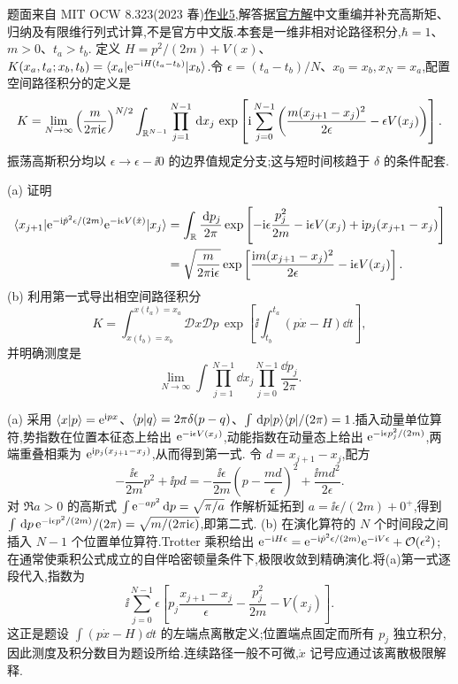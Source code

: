 题面来自 MIT OCW 8.323(2023 春)\href{https://ocw.mit.edu/courses/8-323-relativistic-quantum-field-theory-i-spring-2023/mit8_323_s23_pset05.pdf}{作业5},解答据\href{https://ocw.mit.edu/courses/8-323-relativistic-quantum-field-theory-i-spring-2023/mit8_323_s23_pset_05sol.pdf}{官方解}中文重编并补充高斯矩、归纳及有限维行列式计算,不是官方中文版.本套是一维非相对论路径积分,$\hbar=1$、$m>0$、$t_a>t_b$.
定义 $H=p^2/(2m)+V(x)$、$K(x_a,t_a;x_b,t_b)=\langle x_a\rvert\mathrm e^{-\mathrm i H(t_a-t_b)}\lvert x_b\rangle$.令 $\epsilon=(t_a-t_b)/N$、$x_0=x_b,x_N=x_a$,配置空间路径积分的定义是
\[
K=\lim_{N\to\infty}\left(\frac{m}{2\pi\mathrm i\epsilon}\right)^{N/2}
\int_{\mathbb R^{N-1}}\prod_{j=1}^{N-1}\,\mathrm d x_j\,
\exp\left[\mathrm i\sum_{j=0}^{N-1}\left(\frac{m(x_{j+1}-x_j)^2}{2\epsilon}-\epsilon V(x_j)\right)\right].
\]
振荡高斯积分均以 $\epsilon\to\epsilon-\ii0$ 的边界值规定分支;这与短时间核趋于 $\delta$ 的条件配套.

\begin{exercise}
(a) 证明
\begin{align*}
\langle x_{j+1}\rvert\mathrm e^{-\mathrm i\hat p^2\epsilon/(2m)}\mathrm e^{-\mathrm i\epsilon V(\hat x)}\lvert x_j\rangle
&=\int_\mathbb R\frac{\,\mathrm d p_j}{2\pi}\exp\left[-\mathrm i\epsilon\frac{p_j^2}{2m}-\mathrm i\epsilon V(x_j)+\mathrm i p_j(x_{j+1}-x_j)\right]\\
&=\sqrt{\frac{m}{2\pi\mathrm i\epsilon}}\exp\left[\frac{\mathrm i m(x_{j+1}-x_j)^2}{2\epsilon}-\mathrm i\epsilon V(x_j)\right].
\end{align*}
(b) 利用第一式导出相空间路径积分
\[
K=\int_{x(t_b)=x_b}^{x(t_a)=x_a}\mathcal Dx\mathcal Dp\,
\exp\left[\ii\int_{t_b}^{t_a}(p\dot x-H)\dd t\right],
\]
并明确测度是
\[
\lim_{N\to\infty}\int\prod_{j=1}^{N-1}\dd x_j\prod_{j=0}^{N-1}\frac{\dd p_j}{2\pi}.
\]
\end{exercise}
\begin{solution}
(a) 采用 $\langle x\vert p\rangle=\mathrm e^{\mathrm i px}$、$\langle p\vert q\rangle=2\pi\delta(p-q)$、$\int\,\mathrm d p\lvert p\rangle\langle p\rvert/(2\pi)=1$.插入动量单位算符,势指数在位置本征态上给出 $\mathrm e^{-\mathrm i\epsilon V(x_j)}$,动能指数在动量态上给出 $\mathrm e^{-\mathrm i\epsilon p_j^2/(2m)}$,两端重叠相乘为 $\mathrm e^{\mathrm i p_j(x_{j+1}-x_j)}$,从而得到第一式.
令 $d=x_{j+1}-x_j$,配方
\[
-\frac{\ii\epsilon}{2m}p^2+\ii pd
=-\frac{\ii\epsilon}{2m}\left(p-\frac{md}{\epsilon}\right)^2+\frac{\ii md^2}{2\epsilon}.
\]
对 $\Re a>0$ 的高斯式 $\int\mathrm e^{-ap^2}\,\mathrm d p=\sqrt{\pi/a}$ 作解析延拓到 $a=\ii\epsilon/(2m)+0^+$,得到 $\int\,\mathrm d p\,\mathrm e^{-\mathrm i\epsilon p^2/(2m)}/(2\pi)=\sqrt{m/(2\pi\mathrm i\epsilon)}$,即第二式.
(b) 在演化算符的 $N$ 个时间段之间插入 $N-1$ 个位置单位算符.Trotter 乘积给出
$\mathrm e^{-\mathrm i H\epsilon}=\mathrm e^{-\mathrm i\hat p^2\epsilon/(2m)}\mathrm e^{-\mathrm i V\epsilon}+\mathcal O(\epsilon^2)$;在通常使乘积公式成立的自伴哈密顿量条件下,极限收敛到精确演化.将(a)第一式逐段代入,指数为
\[
\ii\sum_{j=0}^{N-1}\epsilon\left[p_j\frac{x_{j+1}-x_j}{\epsilon}-\frac{p_j^2}{2m}-V(x_j)\right].
\]
这正是题设 $\int(p\dot x-H)\dd t$ 的左端点离散定义;位置端点固定而所有 $p_j$ 独立积分,因此测度及积分数目为题设所给.连续路径一般不可微,$\dot x$ 记号应通过该离散极限解释.
\end{solution}

